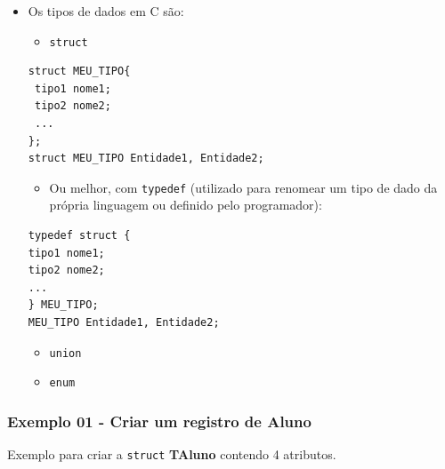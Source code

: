 \documentclass[12pt,a4paper]{article}
\providecommand{\tightlist}{%
      \setlength{\itemsep}{0pt}\setlength{\parskip}{0pt}}
\begin{document}
    \begin{itemize}
\item
  Os tipos de dados em C são:

  \begin{itemize}
  \tightlist
  \item
    \texttt{struct}
  \end{itemize}

\begin{verbatim}
struct MEU_TIPO{
 tipo1 nome1;
 tipo2 nome2;
 ...
};
struct MEU_TIPO Entidade1, Entidade2;
\end{verbatim}

  \begin{itemize}
  \tightlist
  \item
    Ou melhor, com \texttt{typedef} (utilizado para renomear um tipo de
    dado da própria linguagem ou definido pelo programador):
  \end{itemize}

\begin{verbatim}
typedef struct {
tipo1 nome1;
tipo2 nome2;
...
} MEU_TIPO;
MEU_TIPO Entidade1, Entidade2;
\end{verbatim}

  \begin{itemize}
  \tightlist
  \item
    \texttt{union}
  \item
    \texttt{enum}
  \end{itemize}
\end{itemize}

    \hypertarget{exemplo-01---criar-um-registro-de-aluno}{%
\subsubsection{Exemplo 01 - Criar um registro de
Aluno}\label{exemplo-01---criar-um-registro-de-aluno}}

Exemplo para criar a \texttt{struct} \textbf{TAluno} contendo 4
atributos.
\end{document}
